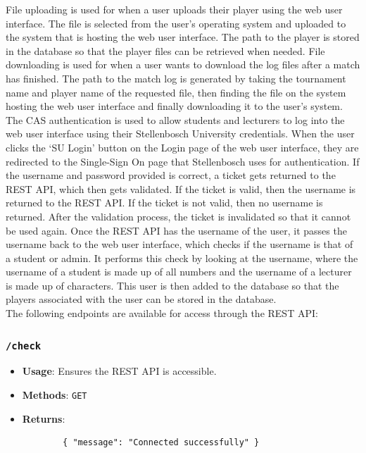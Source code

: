 \documentclass[a4paper, 11pt]{report}
\begin{document}
File uploading is used for when a user uploads their player using the web user
interface. The file is selected from the user's operating system and uploaded
to the system that is hosting the web user interface. The path to the player
is stored in the database so that the player files can be retrieved when needed.
File downloading is used for when a user wants to download the log files after
a match has finished. The path to the match log is generated by taking the
tournament name and player name of the requested file, then finding the file on
the system hosting the web user interface and finally downloading it to the user's
system. \\

The CAS authentication is used to allow students and lecturers to log into the
web user interface using their Stellenbosch University credentials. When the
user clicks the `SU Login' button on the Login page of the web user interface,
they are redirected to the Single-Sign On page that Stellenbosch uses for
authentication. If the username and password provided is correct, a ticket gets
returned to the REST API, which then gets validated. If the ticket is valid, then
the username is returned to the REST API. If the ticket is not valid, then no
username is returned. After the validation process, the ticket is invalidated so
that it cannot be used again. Once the REST API has the username of the user,
it passes the username back to the web user interface, which checks if the username
is that of a student or admin. It performs this check by looking at the username,
where the username of a student is made up of all numbers and the username of
a lecturer is made up of characters. This user is then added to the database so
that the players associated with the user can be stored in the database. \\

The following endpoints are available for access through the REST API:
\subsubsection*{\texttt{/check}}
\begin{itemize}
	\item \textbf{Usage}: Ensures the REST API is accessible.
	\item \textbf{Methods}: \texttt{GET}
	\item \textbf{Returns}:
	\begin{verbatim}
		{ "message": "Connected successfully" }
	\end{verbatim}
\end{itemize}
\end{document}
